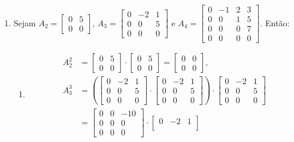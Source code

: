 \documentclass[12pt,a4paper]{article}
\begin{document}
\begin{enumerate}
\begin{enumerate}
\item Sejam $A_2 =
\begin{bmatrix}
0 & 5 \\
0 & 0
\end{bmatrix}$, $A_3 =
\begin{bmatrix}
0 & -2 & 1 \\
0 &  0 & 5 \\
0 &  0 & 0
\end{bmatrix}$ e $A_4 =
\begin{bmatrix}
0 & -1 & 2 & 3 \\
0 &  0 & 1 & 5 \\
0 &  0 & 0 & 7 \\
0 &  0 & 0 & 0
\end{bmatrix}$. Então:
\begin{enumerate}
\item
\begin{align*}
A_2^2 & =
\begin{bmatrix}
0 & 5 \\
0 & 0
\end{bmatrix}
\cdot
\begin{bmatrix}
0 & 5 \\
0 & 0
\end{bmatrix}
=
\begin{bmatrix}
0 & 0 \\
0 & 0
\end{bmatrix}, \\
A_3^3 & =
\left(
\begin{bmatrix}
0 & -2 & 1 \\
0 &  0 & 5 \\
0 &  0 & 0
\end{bmatrix}
\cdot
\begin{bmatrix}
0 & -2 & 1 \\
0 &  0 & 5 \\
0 &  0 & 0
\end{bmatrix}
\right)
\cdot
\begin{bmatrix}
0 & -2 & 1 \\
0 &  0 & 5 \\
0 &  0 & 0
\end{bmatrix} \\
& =
\begin{bmatrix}
0 & 0 & -10 \\
0 & 0 & 0 \\
0 & 0 & 0
\end{bmatrix}
\cdot
\begin{bmatrix}
0 & -2 & 1 \\

\end{bmatrix}
\end{align*}
\end{enumerate}
\end{enumerate}
\end{enumerate}
\end{document}
